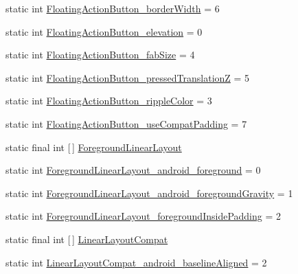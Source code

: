 \begin{DoxyCompactItemize}
\item 
static int \hyperlink{classandroid_1_1support_1_1v7_1_1appcompat_1_1R_1_1styleable_a90c9e09b5a738fa569f0bf4b9cbe536e}{Floating\+Action\+Button\+\_\+border\+Width} = 6
\item 
static int \hyperlink{classandroid_1_1support_1_1v7_1_1appcompat_1_1R_1_1styleable_a11aec0e64f52fb4ec43da30d5c89dc2f}{Floating\+Action\+Button\+\_\+elevation} = 0
\item 
static int \hyperlink{classandroid_1_1support_1_1v7_1_1appcompat_1_1R_1_1styleable_abfe4b5cb807f029e53b6d0b103915d9d}{Floating\+Action\+Button\+\_\+fab\+Size} = 4
\item 
static int \hyperlink{classandroid_1_1support_1_1v7_1_1appcompat_1_1R_1_1styleable_a4b64b16277ffe93157834b6ae898ccb9}{Floating\+Action\+Button\+\_\+pressed\+TranslationZ} = 5
\item 
static int \hyperlink{classandroid_1_1support_1_1v7_1_1appcompat_1_1R_1_1styleable_a1b00a775eb9bce08afe75deef83f51f1}{Floating\+Action\+Button\+\_\+ripple\+Color} = 3
\item 
static int \hyperlink{classandroid_1_1support_1_1v7_1_1appcompat_1_1R_1_1styleable_ae8d13a787b0f198873c19c0c9ffbf158}{Floating\+Action\+Button\+\_\+use\+Compat\+Padding} = 7
\item 
static final int \mbox{[}$\,$\mbox{]} \hyperlink{classandroid_1_1support_1_1v7_1_1appcompat_1_1R_1_1styleable_ad3fca4982ac43d82ecd05796cc15eef9}{Foreground\+Linear\+Layout}
\item 
static int \hyperlink{classandroid_1_1support_1_1v7_1_1appcompat_1_1R_1_1styleable_af337e2da4a51b19cc581fe21e3ed35bc}{Foreground\+Linear\+Layout\+\_\+android\+\_\+foreground} = 0
\item 
static int \hyperlink{classandroid_1_1support_1_1v7_1_1appcompat_1_1R_1_1styleable_ac69a29699eef83027666506239d7956a}{Foreground\+Linear\+Layout\+\_\+android\+\_\+foreground\+Gravity} = 1
\item 
static int \hyperlink{classandroid_1_1support_1_1v7_1_1appcompat_1_1R_1_1styleable_ac64be02302c54871cc61d90fb2622959}{Foreground\+Linear\+Layout\+\_\+foreground\+Inside\+Padding} = 2
\item 
static final int \mbox{[}$\,$\mbox{]} \hyperlink{classandroid_1_1support_1_1v7_1_1appcompat_1_1R_1_1styleable_a765d32873526b8c36de14b184094582d}{Linear\+Layout\+Compat}
\item 
static int \hyperlink{classandroid_1_1support_1_1v7_1_1appcompat_1_1R_1_1styleable_a2ab23befda4596dd9b3123293c0c7363}{Linear\+Layout\+Compat\+\_\+android\+\_\+baseline\+Aligned} = 2

\end{DoxyCompactItemize}
